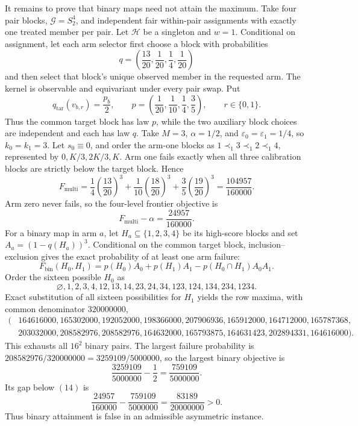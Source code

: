 It remains to prove that binary maps need not attain the maximum. Take four pair blocks, \(\mathcal G=S_2^4\), and independent fair within-pair assignments with exactly one treated member per pair. Let \(\mathcal H\) be a singleton and \(w=1\). Conditional on assignment, let each arm selector first choose a block with probabilities
\[
q=\left(\frac{13}{20},\frac1{20},\frac14,\frac1{20}\right)
\tag{11}
\]
and then select that block's unique observed member in the requested arm. The kernel is observable and equivariant under every pair swap. Put
\[
q_{\mathrm{tar}}(v_{b,r})=\frac{p_b}{2},
\qquad
p=\left(\frac1{20},\frac1{10},\frac14,\frac35\right),
\qquad r\in\{0,1\}.
\tag{12}
\]
Thus the common target block has law \(p\), while the two auxiliary block choices are independent and each has law \(q\). Take \(M=3\), \(\alpha=1/2\), and \(\varepsilon_0=\varepsilon_1=1/4\), so \(k_0=k_1=3\). Let \(s_0\equiv0\), and order the arm-one blocks as \(1\prec_1 3\prec_1 2\prec_1 4\), represented by \(0,K/3,2K/3,K\). Arm one fails exactly when all three calibration blocks are strictly below the target block. Hence
\[
F_{\mathrm{multi}}=\frac14\left(\frac{13}{20}\right)^3
+\frac1{10}\left(\frac{18}{20}\right)^3
+\frac35\left(\frac{19}{20}\right)^3
=\frac{104957}{160000}.
\tag{13}
\]
Arm zero never fails, so the four-level frontier objective is
\[
F_{\mathrm{multi}}-\alpha=\frac{24957}{160000}.
\tag{14}
\]
For a binary map in arm \(a\), let \(H_a\subseteq\{1,2,3,4\}\) be its high-score blocks and set \(A_a=(1-q(H_a))^3\). Conditional on the common target block, inclusion--exclusion gives the exact probability of at least one arm failure:
\[
F_{\mathrm{bin}}(H_0,H_1)=p(H_0)A_0+p(H_1)A_1-p(H_0\cap H_1)A_0A_1.
\tag{15}
\]
Order the sixteen possible \(H_0\) as
\[
\varnothing,1,2,3,4,12,13,14,23,24,34,123,124,134,234,1234.
\]
Exact substitution of all sixteen possibilities for \(H_1\) yields the row maxima, with common denominator \(320000000\),
\[
\begin{split}
(&164616000,165302000,192052000,198366000,207906936,165912000,164712000,165787368,\\
&203032000,208582976,208582976,164632000,165793875,164631423,202894331,164616000).
\end{split}
\tag{16}
\]
This exhausts all \(16^2\) binary pairs. The largest failure probability is \(208582976/320000000=3259109/5000000\), so the largest binary objective is
\[
\frac{3259109}{5000000}-\frac12=\frac{759109}{5000000}.
\]
Its gap below \((14)\) is
\[
\frac{24957}{160000}-\frac{759109}{5000000}
=\frac{83189}{20000000}>0.
\tag{17}
\]
Thus binary attainment is false in an admissible asymmetric instance.

